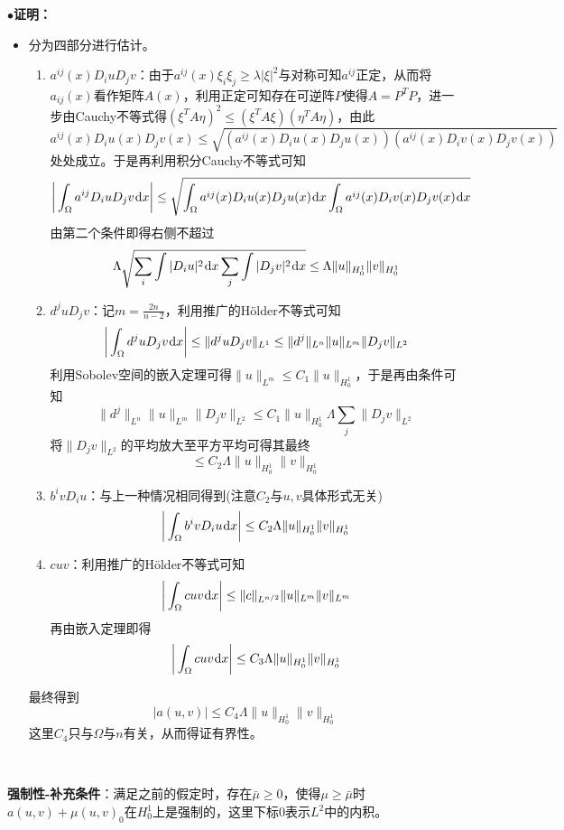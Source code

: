 \documentclass[a4paper,UTF8,fontset=windows,AutoFakeBold]{ctexart}
\newcommand*{\dr}{\hspace{0.07em}\mathrm{d}}
\newcommand{\proo}[1]{{\kaishu $\bullet$\textbf{证明：}
\begin{itemize}
    \item[] #1
\end{itemize}
}}
\begin{document}
\proo{
    分为四部分进行估计。
    \begin{enumerate}
        \item $a^{ij}(x)D_iuD_jv$：由于$a^{ij}(x)\xi_i\xi_j\ge\lambda|\xi|^2$与对称可知$a^{ij}$正定，从而将$a_{ij}(x)$看作矩阵$A(x)$，利用正定可知存在可逆阵$P$使得$A=P^TP$，进一步由Cauchy不等式得$(\xi^TA\eta)^2\le(\xi^TA\xi)(\eta^TA\eta)$，由此
        $$a^{ij}(x)D_iu(x)D_jv(x)\le\sqrt{(a^{ij}(x)D_iu(x)D_ju(x))(a^{ij}(x)D_iv(x)D_jv(x))}$$
        处处成立。于是再利用积分Cauchy不等式可知
        $$\bigg|\int_\Omega a^{ij}D_iuD_jv\dr x\bigg|\le\sqrt{\int_\Omega a^{ij}(x)D_iu(x)D_ju(x)\dr x\int_\Omega a^{ij}(x)D_iv(x)D_jv(x)\dr x}$$
        由第二个条件即得右侧不超过
        $$\Lambda\sqrt{\sum_i\int|D_iu|^2\dr x\sum_j\int|D_jv|^2\dr x}\le\Lambda\|u\|_{H_0^1}\|v\|_{H_0^1}$$

        \item $d^juD_jv$：记$m=\frac{2n}{n-2}$，利用推广的H\"older不等式可知
        $$\bigg|\int_\Omega d^juD_jv\dr x\bigg|\le\|d^juD_jv\|_{L^1}\le\|d^j\|_{L^n}\|u\|_{L^m}\|D_jv\|_{L^2}$$
        利用Sobolev空间的嵌入定理可得$\|u\|_{L^m}\le C_1\|u\|_{H_0^1}$，于是再由条件可知
        $$\|d^j\|_{L^n}\|u\|_{L^m}\|D_jv\|_{L^2}\le C_1\|u\|_{H_0^1}\Lambda\sum_j\|D_jv\|_{L^2}$$
        将$\|D_jv\|_{L^2}$的平均放大至平方平均可得其最终
        $$\le C_2\Lambda\|u\|_{H_0^1}\|v\|_{H_0^1}$$

        \item $b^ivD_iu$：与上一种情况相同得到(注意$C_2$与$u,v$具体形式无关)
        $$\bigg|\int_\Omega b^ivD_iu\dr x\bigg|\le C_2\Lambda\|u\|_{H_0^1}\|v\|_{H_0^1}$$

        \item $cuv$：利用推广的H\"older不等式可知
        $$\bigg|\int_\Omega cuv\dr x\bigg|\le\|c\|_{L^{n/2}}\|u\|_{L^m}\|v\|_{L^m}$$
        再由嵌入定理即得
        $$\bigg|\int_\Omega cuv\dr x\bigg|\le C_3\Lambda\|u\|_{H_0^1}\|v\|_{H_0^1}$$
    \end{enumerate}
    
    最终得到
    $$|a(u,v)|\le C_4\Lambda\|u\|_{H_0^1}\|v\|_{H_0^1}$$
    这里$C_4$只与$\Omega$与$n$有关，从而得证有界性。
}

\

\textbf{强制性-补充条件}：满足之前的假定时，存在$\bar\mu\ge0$，使得$\mu\ge\bar\mu$时$a(u,v)+\mu(u,v)_0$在$H_0^1$上是强制的，这里下标0表示$L^2$中的内积。
\end{document}
